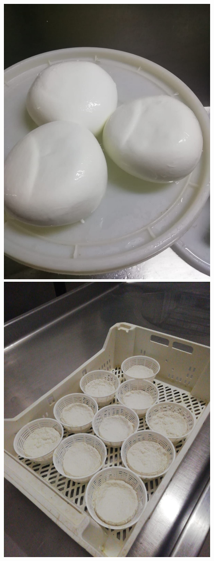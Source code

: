 \documentclass[12pt]{report}
\begin{document}
\begin{figure}[H]
\centering
\includegraphics[scale=0.10]{imgs/photos/img1.jpeg}
\includegraphics[scale=0.10]{imgs/photos/img2.jpeg}

\end{figure}
\end{document}
